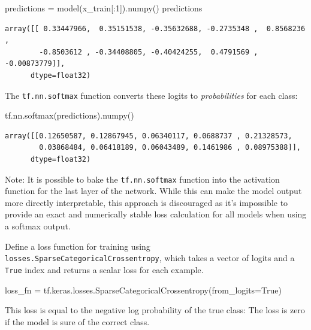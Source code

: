 \documentclass[
  letterpaper,
  DIV=11,
  numbers=noendperiod]{scrreprt}
\newenvironment{Shaded}{\begin{snugshade}}{\end{snugshade}}
\newcommand{\DecValTok}[1]{\textcolor[rgb]{0.68,0.00,0.00}{#1}}
\newcommand{\NormalTok}[1]{\textcolor[rgb]{0.00,0.23,0.31}{#1}}
\newcommand{\OperatorTok}[1]{\textcolor[rgb]{0.37,0.37,0.37}{#1}}
\newcommand{\VariableTok}[1]{\textcolor[rgb]{0.07,0.07,0.07}{#1}}
\begin{document}
\begin{Shaded}
\begin{Highlighting}[]
\NormalTok{predictions }\OperatorTok{=}\NormalTok{ model(x\_train[:}\DecValTok{1}\NormalTok{]).numpy()}
\NormalTok{predictions}
\end{Highlighting}
\end{Shaded}

\begin{verbatim}
array([[ 0.33447966,  0.35151538, -0.35632688, -0.2735348 ,  0.8568236 ,
        -0.8503612 , -0.34408805, -0.40424255,  0.4791569 , -0.00873779]],
      dtype=float32)
\end{verbatim}

The \texttt{tf.nn.softmax} function converts these logits to
\emph{probabilities} for each class:

\begin{Shaded}
\begin{Highlighting}[]
\NormalTok{tf.nn.softmax(predictions).numpy()}
\end{Highlighting}
\end{Shaded}

\begin{verbatim}
array([[0.12650587, 0.12867945, 0.06340117, 0.0688737 , 0.21328573,
        0.03868484, 0.06418189, 0.06043489, 0.1461986 , 0.08975388]],
      dtype=float32)
\end{verbatim}

Note: It is possible to bake the \texttt{tf.nn.softmax} function into
the activation function for the last layer of the network. While this
can make the model output more directly interpretable, this approach is
discouraged as it's impossible to provide an exact and numerically
stable loss calculation for all models when using a softmax output.

Define a loss function for training using
\texttt{losses.SparseCategoricalCrossentropy}, which takes a vector of
logits and a \texttt{True} index and returns a scalar loss for each
example.

\begin{Shaded}
\begin{Highlighting}[]
\NormalTok{loss\_fn }\OperatorTok{=}\NormalTok{ tf.keras.losses.SparseCategoricalCrossentropy(from\_logits}\OperatorTok{=}\VariableTok{True}\NormalTok{)}
\end{Highlighting}
\end{Shaded}

This loss is equal to the negative log probability of the true class:
The loss is zero if the model is sure of the correct class.
\end{document}
